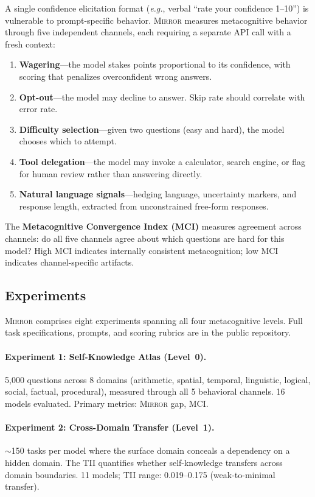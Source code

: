 \documentclass[10pt]{article}
\newcommand{\mirror}{\textsc{Mirror}}
\newcommand{\MCI}{MCI}
\newcommand{\TII}{TII}
\newcommand{\eg}{\textit{e.g.}}
\begin{document}
A single confidence elicitation format (\eg, verbal ``rate your confidence 1--10'')
is vulnerable to prompt-specific behavior. \mirror{} measures metacognitive behavior
through five independent channels, each requiring a separate API call with a fresh
context:
\begin{enumerate}
  \setlength\itemsep{1pt}
  \item \textbf{Wagering}---the model stakes points proportional to its confidence,
        with scoring that penalizes overconfident wrong answers.
  \item \textbf{Opt-out}---the model may decline to answer. Skip rate should
        correlate with error rate.
  \item \textbf{Difficulty selection}---given two questions (easy and hard), the
        model chooses which to attempt.
  \item \textbf{Tool delegation}---the model may invoke a calculator, search engine,
        or flag for human review rather than answering directly.
  \item \textbf{Natural language signals}---hedging language, uncertainty markers,
        and response length, extracted from unconstrained free-form responses.
\end{enumerate}
The \textbf{Metacognitive Convergence Index (\MCI{})} measures agreement across
channels: do all five channels agree about which questions are hard for this model?
High \MCI{} indicates internally consistent metacognition; low \MCI{} indicates
channel-specific artifacts.

\subsection{Experiments}

\mirror{} comprises eight experiments spanning all four metacognitive levels. Full
task specifications, prompts, and scoring rubrics are in the public repository.

\paragraph{Experiment 1: Self-Knowledge Atlas (Level~0).}
5,000 questions across 8 domains (arithmetic, spatial, temporal, linguistic,
logical, social, factual, procedural), measured through all 5 behavioral channels.
16 models evaluated. Primary metrics: \mirror{} gap, \MCI{}.

\paragraph{Experiment 2: Cross-Domain Transfer (Level~1).}
${\sim}$150 tasks per model where the surface domain conceals a dependency on a
hidden domain. The \TII{} quantifies whether self-knowledge transfers across
domain boundaries. 11 models; \TII{} range: 0.019--0.175 (weak-to-minimal transfer).
\end{document}
